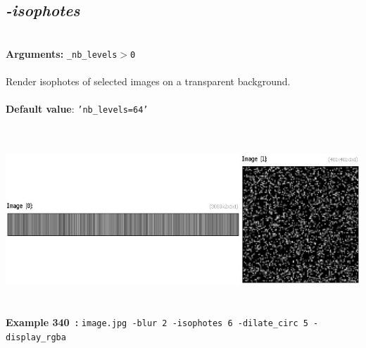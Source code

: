 \documentclass[a4paper,11pt,twoside]{book}
\begin{document}
\subsection{\emph{-isophotes} }\vspace*{-0.5em}
~\\\textbf{Arguments: } 
{\small \texttt{\_nb\_levels$>$0}}\\~\\
Render isophotes of selected images on a transparent background.
~\\~\\\textbf{Default value}: {\small \texttt{'nb\_levels=64'}}
\begin{center}\includegraphics[keepaspectratio=true,height=7cm,width=\textwidth]{img/gmic_def340.jpg}\\
{\footnotesize \textbf{Example 340~:} \texttt{image.jpg -blur 2 -isophotes 6 -dilate\_circ 5 -display\_rgba}}
\end{center}
\end{document}
